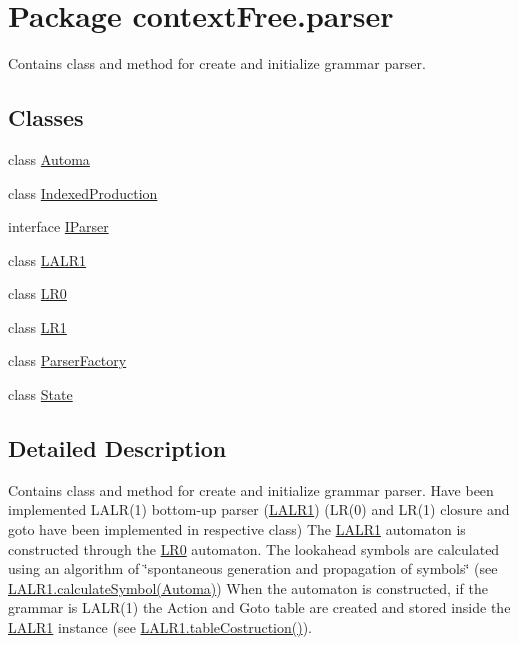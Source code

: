\hypertarget{namespacecontext_free_1_1parser}{\section{Package context\-Free.\-parser}
\label{namespacecontext_free_1_1parser}
}


Contains class and method for create and initialize grammar parser.  


\subsection*{Classes}
\begin{DoxyCompactItemize}
\item 
class \hyperlink{classcontext_free_1_1parser_1_1_automa}{Automa}
\item 
class \hyperlink{classcontext_free_1_1parser_1_1_indexed_production}{Indexed\-Production}
\item 
interface \hyperlink{interfacecontext_free_1_1parser_1_1_i_parser}{I\-Parser}
\item 
class \hyperlink{classcontext_free_1_1parser_1_1_l_a_l_r1}{L\-A\-L\-R1}
\item 
class \hyperlink{classcontext_free_1_1parser_1_1_l_r0}{L\-R0}
\item 
class \hyperlink{classcontext_free_1_1parser_1_1_l_r1}{L\-R1}
\item 
class \hyperlink{classcontext_free_1_1parser_1_1_parser_factory}{Parser\-Factory}
\item 
class \hyperlink{classcontext_free_1_1parser_1_1_state}{State}
\end{DoxyCompactItemize}


\subsection{Detailed Description}
Contains class and method for create and initialize grammar parser. Have been implemented L\-A\-L\-R(1) bottom-\/up parser (\hyperlink{classcontext_free_1_1parser_1_1_l_a_l_r1}{L\-A\-L\-R1}) (L\-R(0) and L\-R(1) closure and goto have been implemented in respective class) The \hyperlink{classcontext_free_1_1parser_1_1_l_a_l_r1}{L\-A\-L\-R1} automaton is constructed through the \hyperlink{classcontext_free_1_1parser_1_1_l_r0}{L\-R0} automaton. The lookahead symbols are calculated using an algorithm of \char`\"{}spontaneous generation and propagation of symbols\char`\"{} (see \hyperlink{classcontext_free_1_1parser_1_1_l_a_l_r1_aeec32b5c83e031225114f46ac377f804}{L\-A\-L\-R1.\-calculate\-Symbol(\-Automa)}) When the automaton is constructed, if the grammar is L\-A\-L\-R(1) the Action and Goto table are created and stored inside the \hyperlink{classcontext_free_1_1parser_1_1_l_a_l_r1}{L\-A\-L\-R1} instance (see \hyperlink{classcontext_free_1_1parser_1_1_l_a_l_r1_a79576626b3b59b832faecc986b293b36}{L\-A\-L\-R1.\-table\-Costruction()}).\par


